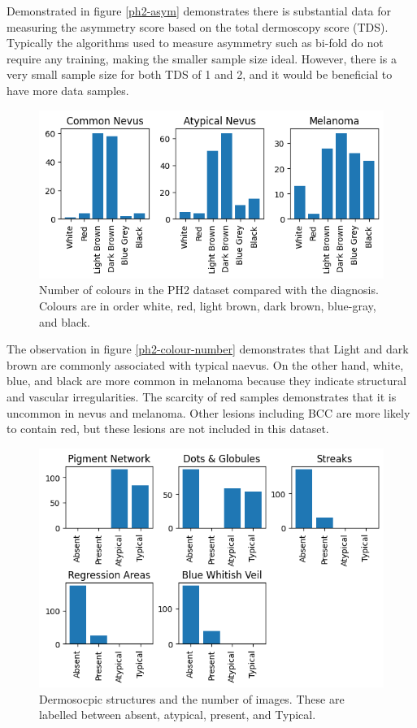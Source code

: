 Demonstrated in figure \ref{ph2-asym} demonstrates there is substantial data for measuring the asymmetry score based on the total dermoscopy score (TDS). Typically the algorithms used to measure asymmetry such as bi-fold do not require any training, making the smaller sample size ideal. However, there is a very small sample size for both TDS of 1 and 2, and it would be beneficial to have more data samples.

\begin{figure}
	\centering
	\includegraphics[scale=0.8]{images/ph2/ph2-colour-number.png}
	\caption{Number of colours in the PH2 dataset compared with the diagnosis. Colours are in order white, red, light brown, dark brown, blue-gray, and black.} 
\end{figure} \label{ph2-colour-number}

The observation in figure \ref{ph2-colour-number} demonstrates that Light and dark brown are commonly associated with typical naevus. On the other hand, white, blue, and black are more common in melanoma because they indicate structural and vascular irregularities. The scarcity of red samples demonstrates that it is uncommon in nevus and melanoma. Other lesions including BCC are more likely to contain red\cite{}, but these lesions are not included in this dataset.

\begin{figure}
	\centering
	\includegraphics[scale=0.8]{images/ph2/ph2-dermo-number.png}
	\caption{Dermosocpic structures and the number of images. These are labelled between absent, atypical, present, and Typical.} 
\end{figure} \label{ph2-dermo-number}

